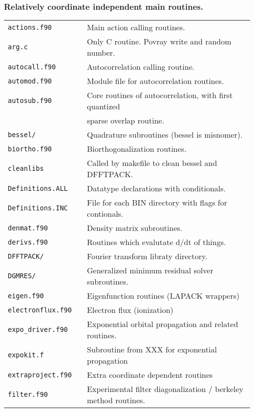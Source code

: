 \subsubsection{Relatively coordinate independent main routines.}
{\footnotesize
\begin{tabular}{ll}
\verb#actions.f90    #& Main action calling routines. \\
\verb#arg.c          #& Only C routine.  Povray write and random number. \\
\verb#autocall.f90   #& Autocorrelation calling routine. \\
\verb#automod.f90    #& Module file for autocorrelation routines. \\
\verb#autosub.f90    #& Core routines of autocorrelation, with first quantized \\
             & \quad sparse overlap routine. \\
\verb#bessel/        #& Quadrature subroutines (bessel is misnomer). \\
\verb#biortho.f90       #& Biorthogonalization routines. \\
\verb#cleanlibs      #& Called by makefile to clean bessel and DFFTPACK. \\
\verb#Definitions.ALL#& Datatype declarations with conditionals. \\
\verb#Definitions.INC#& File for each BIN directory with flags for contionals. \\
\verb#denmat.f90     #& Density matrix subroutines. \\
\verb#derivs.f90     #& Routines which evalutate d/dt of things. \\
\verb#DFFTPACK/      #& Fourier transform libraty directory. \\
\verb#DGMRES/       #& Generalized minimum residual solver subroutines. \\
\verb#eigen.f90      #& Eigenfunction routines (LAPACK wrappers) \\
\verb#electronflux.f90   #& Electron flux (ionization) \\
\verb#expo_driver.f90  #& Exponential orbital propagation and related routines. \\
\verb#expokit.f      # & Subroutine from XXX for exponential propagation \\
\verb#extraproject.f90# & Extra coordinate dependent routines \\
\verb#filter.f90    # & Experimental filter diagonalization / berkeley method routines. \\

\end{tabular}}
